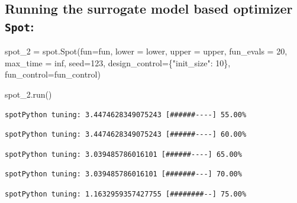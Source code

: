 \documentclass[
  letterpaper,
  DIV=11,
  numbers=noendperiod]{scrreprt}
\newenvironment{Shaded}{\begin{snugshade}}{\end{snugshade}}
\newcommand{\DecValTok}[1]{\textcolor[rgb]{0.68,0.00,0.00}{#1}}
\newcommand{\NormalTok}[1]{\textcolor[rgb]{0.00,0.23,0.31}{#1}}
\newcommand{\OperatorTok}[1]{\textcolor[rgb]{0.37,0.37,0.37}{#1}}
\newcommand{\StringTok}[1]{\textcolor[rgb]{0.13,0.47,0.30}{#1}}
\begin{document}
\hypertarget{running-the-surrogate-model-based-optimizer-spot}{%
\subsection{\texorpdfstring{Running the surrogate model based optimizer
\texttt{Spot}:}{Running the surrogate model based optimizer Spot:}}\label{running-the-surrogate-model-based-optimizer-spot}}

\begin{Shaded}
\begin{Highlighting}[]
\NormalTok{spot\_2 }\OperatorTok{=}\NormalTok{ spot.Spot(fun}\OperatorTok{=}\NormalTok{fun,}
\NormalTok{                   lower }\OperatorTok{=}\NormalTok{ lower,}
\NormalTok{                   upper }\OperatorTok{=}\NormalTok{ upper,}
\NormalTok{                   fun\_evals }\OperatorTok{=} \DecValTok{20}\NormalTok{,}
\NormalTok{                   max\_time }\OperatorTok{=}\NormalTok{ inf,}
\NormalTok{                   seed}\OperatorTok{=}\DecValTok{123}\NormalTok{,}
\NormalTok{                   design\_control}\OperatorTok{=}\NormalTok{\{}\StringTok{"init\_size"}\NormalTok{: }\DecValTok{10}\NormalTok{\},}
\NormalTok{                   fun\_control}\OperatorTok{=}\NormalTok{fun\_control)}
\end{Highlighting}
\end{Shaded}

\begin{Shaded}
\begin{Highlighting}[]
\NormalTok{spot\_2.run()}
\end{Highlighting}
\end{Shaded}

\begin{verbatim}
spotPython tuning: 3.4474628349075243 [######----] 55.00% 
\end{verbatim}

\begin{verbatim}
spotPython tuning: 3.4474628349075243 [######----] 60.00% 
\end{verbatim}

\begin{verbatim}
spotPython tuning: 3.039485786016101 [######----] 65.00% 
\end{verbatim}

\begin{verbatim}
spotPython tuning: 3.039485786016101 [#######---] 70.00% 
\end{verbatim}

\begin{verbatim}
spotPython tuning: 1.1632959357427755 [########--] 75.00% 
\end{verbatim}
\end{document}
